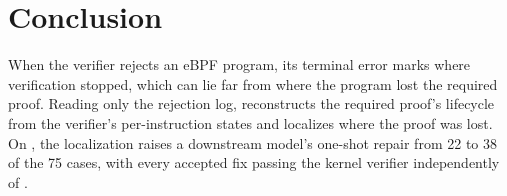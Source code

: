 \section{Conclusion}
\label{sec:conclusion}

When the verifier rejects an eBPF program, its terminal error marks where verification stopped, which can lie far from where the program lost the required proof.
Reading only the rejection log, \sys reconstructs the required proof's lifecycle from the verifier's per-instruction states and localizes where the proof was lost.
On \bench, the \sys localization raises a downstream model's one-shot repair from 22 to 38 of the 75 cases, with every accepted fix passing the kernel verifier independently of \sys.
